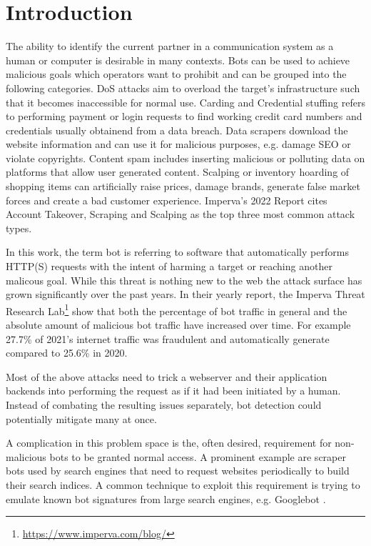 \documentclass[
    fontsize=12pt,
    headings=small,
    parskip=half,           %
    bibliography=totoc,
    numbers=noenddot,       %
    open=any,               %
    final,                   %
    table
]{scrreprt}
\begin{document}
\tableofcontents

\chapter{Introduction}

The ability to identify the current partner in a communication system as a human or computer is desirable in many contexts. Bots can be used to achieve malicious goals which operators want to prohibit and can be grouped into the following categories. DoS attacks aim to overload the target's infrastructure such that it becomes inaccessible for normal use. Carding and Credential stuffing refers to performing payment or login requests to find working credit card numbers and credentials usually obtainend from a data breach. Data scrapers download the website information and can use it for malicious purposes, e.g. damage SEO or violate copyrights. Content spam includes inserting malicious or polluting data on platforms that allow user generated content. Scalping or inventory hoarding of shopping items can artificially raise prices, damage brands, generate false market forces and create a bad customer experience. Imperva's 2022 Report\cite{BAD_BOT_REPORT2022} cites Account Takeover, Scraping and Scalping as the top three most common attack types.

In this work, the term bot is referring to software that automatically performs HTTP(S) requests with the intent of harming a target or reaching another malicous goal. While this threat is nothing new to the web the attack surface has grown significantly over the past years. In their yearly report, the Imperva Threat Research Lab\footnote{\url{https://www.imperva.com/blog/}} show that both the percentage of bot traffic in general and the absolute amount of malicious bot traffic have increased over time.\cite{BAD_BOT_REPORT2020,BAD_BOT_REPORT2021,BAD_BOT_REPORT2022} For example 27.7\% of 2021's internet traffic was fraudulent and automatically generate compared to 25.6\% in 2020.

Most of the above attacks need to trick a webserver and their application backends into performing the request as if it had been initiated by a human. Instead of combating the resulting issues separately, bot detection could potentially mitigate many at once.

A complication in this problem space is the, often desired, requirement for non-malicious bots to be granted normal access. A prominent example are scraper bots used by search engines that need to request websites periodically to build their search indices. A common technique to exploit this requirement is trying to emulate known bot signatures from large search engines, e.g. Googlebot \cite{8421894}.
\end{document}
